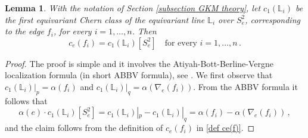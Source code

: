 \documentclass[12pt,a4paper]{amsart}
\theoremstyle{plain}
\newtheorem{lemma}[thm]{Lemma}
\theoremstyle{definition}
\begin{document}
\begin{lemma}\label{geom mean line numbers}
With the notation of Section \ref{subsection GKM theory}, let $c_1(\mathbb{L}_i)$ be the first equivariant Chern class of the equivariant line $\mathbb{L}_i$ over $S^2_e$, corresponding to the edge $f_i$, for every $i=1,\ldots,n$. 
Then 
\begin{equation}\label{equality meaning line number}
c_e(f_i)=c_1(\mathbb{L}_i)[S^2_e]\quad \text{for every }i=1,\ldots,n\,.
\end{equation}
\end{lemma}
\begin{proof}
The proof is simple and it involves the Atiyah-Bott-Berline-Vergne localization formula
(in short ABBV formula), see \cite{MR721448, MR685019}. 
We first observe that 
$c_1(\mathbb{L}_i)|_p=\alpha(f_i)$ and $c_1(\mathbb{L}_i)|_q=\alpha(\nabla_e(f_i))$. From the ABBV formula it follows that
$$
\alpha(e)\cdot c_1(\mathbb{L}_i)[S^2_e]=c_1(\mathbb{L}_i)|_p-c_1(\mathbb{L}_i)|_q= \alpha(f_i)-\alpha(\nabla_e(f_i))\,,
$$
and the claim follows from the definition of $c_e(f_i)$ in \eqref{def ce(f)}.
\end{proof}
\end{document}

